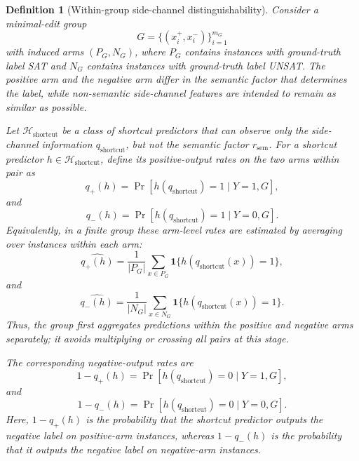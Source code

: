\documentclass[conference]{IEEEtran}
\newtheorem{definition}{Definition}
\theoremstyle{remark}
\newcommand{\shortcutHypCls}{\mathcal{H}_{\mathrm{shortcut}}}
\newcommand{\shortcutPosRate}[1]{q_{+}(#1)}
\newcommand{\shortcutNegRate}[1]{q_{-}(#1)}
\newcommand{\reasonFac}{r_{\mathrm{sem}}}
\newcommand{\shortcutFac}{q_{\mathrm{shortcut}}}
\begin{document}
\begin{definition}[Within-group side-channel distinguishability]
\label{def:deltaG}
Consider a minimal-edit group
\begin{equation}\label{eq:formula-10}
G=\{(x_i^+,x_i^-)\}_{i=1}^{m_G}
\end{equation}
with induced arms $(P_G,N_G)$, where $P_G$ contains instances with ground-truth
label SAT and $N_G$ contains instances with ground-truth label UNSAT.
The positive arm and the negative arm differ in the semantic factor that
determines the label, while non-semantic side-channel features are intended to
remain as similar as possible.

Let $\shortcutHypCls$ be a class of shortcut predictors that can observe only the
side-channel information $\shortcutFac$, but not the semantic factor $\reasonFac$.
For a shortcut predictor $h\in\shortcutHypCls$, define its positive-output rates
on the two arms within pair as
\begin{equation}\label{eq:formula-11}
\shortcutPosRate{h}
=
\Pr[h(\shortcutFac)=1\mid Y=1,G],
\end{equation}
and
\begin{equation}\label{eq:formula-12}
\shortcutNegRate{h}
=
\Pr[h(\shortcutFac)=1\mid Y=0,G].
\end{equation}
Equivalently, in a finite group these arm-level rates are estimated by averaging
over instances within each arm:
\begin{equation}\label{eq:formula-13}
\widehat{\shortcutPosRate{h}}
=
\frac{1}{|P_G|}
\sum_{x\in P_G}
\mathbf{1}\{h(\shortcutFac(x))=1\},
\end{equation}
and
\begin{equation}\label{eq:formula-14}
\widehat{\shortcutNegRate{h}}
=
\frac{1}{|N_G|}
\sum_{x\in N_G}
\mathbf{1}\{h(\shortcutFac(x))=1\}.
\end{equation}
Thus, the group first aggregates predictions within the positive and negative
arms separately; it avoids multiplying or crossing all pairs at this stage.

The corresponding negative-output rates are
\begin{equation}\label{eq:formula-15}
1-\shortcutPosRate{h}
=
\Pr[h(\shortcutFac)=0\mid Y=1,G],
\end{equation}
and
\begin{equation}\label{eq:formula-16}
1-\shortcutNegRate{h}
=
\Pr[h(\shortcutFac)=0\mid Y=0,G].
\end{equation}
Here, $1-\shortcutPosRate{h}$ is the probability that the shortcut predictor
outputs the negative label on positive-arm instances, whereas
$1-\shortcutNegRate{h}$ is the probability that it outputs the negative label on
negative-arm instances.


\end{definition}
\end{document}
